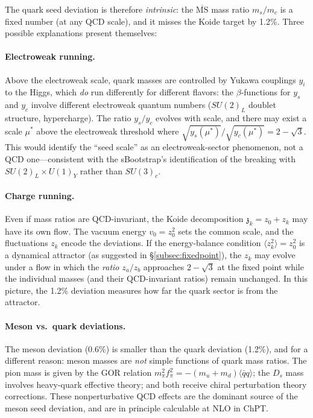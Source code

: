 \documentclass[12pt,a4paper]{article}
\newcommand{\qqbar}{\langle\bar{q}q\rangle}
\newcommand{\zch}{\mathfrak{z}}
\begin{document}
The quark seed deviation is therefore \emph{intrinsic}: the 
$\overline{\text{MS}}$ mass ratio $m_s/m_c$ is a fixed number 
(at any QCD scale), and it misses the Koide target by 1.2\%. 
Three possible explanations present themselves:

\paragraph{Electroweak running.} Above the electroweak scale, 
quark masses are controlled by Yukawa couplings $y_i$ to the 
Higgs, which \emph{do} run differently for different flavors: 
the $\beta$-functions for $y_s$ and $y_c$ involve different 
electroweak quantum numbers ($SU(2)_L$ doublet structure, 
hypercharge). The ratio $y_s/y_c$ evolves with scale, and 
there may exist a scale $\mu^*$ above the electroweak 
threshold where $\sqrt{y_s(\mu^*)}/\sqrt{y_c(\mu^*)} = 2 - \sqrt{3}$. 
This would identify the ``seed scale'' as an electroweak-sector 
phenomenon, not a QCD one---consistent with the sBootstrap's 
identification of the breaking with $SU(2)_L \times U(1)_Y$ 
rather than $SU(3)_c$.

\paragraph{Charge running.} Even if mass ratios are QCD-invariant, 
the Koide decomposition $\zch_k = z_0 + z_k$ may have its own 
flow. The vacuum energy $v_0 = z_0^2$ sets the common scale, 
and the fluctuations $z_k$ encode the deviations. If the 
energy-balance condition $\langle z_k^2\rangle = z_0^2$ is a 
dynamical attractor (as suggested in \S\ref{subsec:fixedpoint}), 
the $z_k$ may evolve under a flow in which the \emph{ratio} 
$z_a/z_b$ approaches $2 - \sqrt{3}$ at the fixed point while 
the individual masses (and their QCD-invariant ratios) remain 
unchanged. In this picture, the 1.2\% deviation measures how 
far the quark sector is from the attractor.

\paragraph{Meson vs.\ quark deviations.} The meson deviation 
(0.6\%) is smaller than the quark deviation (1.2\%), and for 
a different reason: meson masses are \emph{not} simple functions 
of quark mass ratios. The pion mass is given by the GOR 
relation $m_\pi^2 f_\pi^2 = -(m_u + m_d)\qqbar$; the $D_s$ 
mass involves heavy-quark effective theory; and both receive 
chiral perturbation theory corrections. These nonperturbative 
QCD effects are the dominant source of the meson seed deviation, 
and are in principle calculable at NLO in ChPT.
\end{document}
